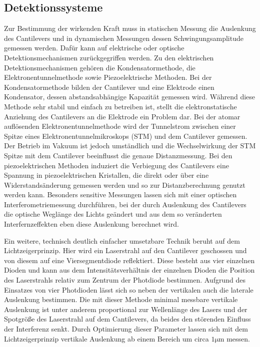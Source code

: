           \FloatBarrier




      \newpage
      \subsection{Detektionssysteme}
          Zur Bestimmung der wirkenden Kraft muss in statischen Messung die Auslenkung des Cantilevers und in dynamischen Messungen dessen Schwingungsamplitude gemessen werden. Dafür kann auf elektrische
          oder optische Detektionsmechanismen zurückgegriffen werden. 
          Zu den elektrischen Detektionsmechanismen gehören die Kondensatormethode, die Elektronentunnelmethode sowie Piezoelektrische Methoden. Bei der Kondensatormethode bilden der Cantilever und eine
          Elektrode einen Kondensator, dessen abstandsabhängige Kapazität gemessen wird. Während diese Methode sehr stabil und einfach zu betreiben ist, stellt die elektronstatische Anziehung des Cantilevers
          an die Elektrode ein Problem dar. Bei der atomar auflösenden Elektronentunnelmethode wird der Tunnelstrom zwischen einer Spitze eines Elektronentunnelmikroskops (STM) und dem Cantilever gemessen. 
          Der Betrieb im Vakuum ist jedoch umständlich und die Wechselwirkung der STM Spitze mit dem Cantilever beeinflusst die genaue Distanzmessung. Bei den piezoelektrischen Methoden induziert die Verbiegung
          des Cantilevers eine Spannung in piezoelektrischen Kristallen, die direkt oder über eine Widerstandsänderung gemessen werden und so zur Distanzberechnung genutzt werden kann. 
          Besonders sensitive Messungen lassen sich mit einer optischen Interferometriemessung durchführen, bei der durch Auslenkung des Cantilevers die optische Weglänge des Lichts geändert und aus dem so
          veränderten Interfernzeffekten eben diese Auslenkung berechnet wird.

          Ein weitere, technisch deutlich einfacher umsetzbare Technik beruht auf dem Lichtzeigerprinzip. Hier wird ein Laserstrahl auf den Cantilever geschossen und von diesem auf eine Viersegmentdiode 
          reflektiert. Diese besteht aus vier einzelnen Dioden und kann aus dem Intensitätsverhältnis der einzelnen Dioden die Position des Laserstrahls relativ zum Zentrum der Photdiode bestimmen. Aufgrund
          des Einsatzes von vier Photdioden lässt sich so neben der vertikalen auch die laterale Auslenkung bestimmen. Die mit dieser Methode minimal messbare vertikale Auslenkung ist unter anderem proportional
          zur Wellenlänge des Lasers und der Spotgröße des Laserstrahl auf dem Cantilevers, da beides den störenden Einfluss der Interferenz senkt. Durch Optimierung dieser Parameter lassen sich mit dem
          Lichtzeigerprinzip vertikale Auslenkung ab einem Bereich um circa $1 \si{\micro\metre}$ messen.


